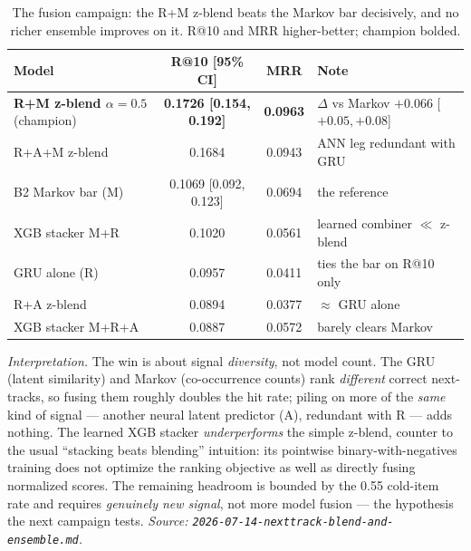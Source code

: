 \documentclass[11pt]{article}
\newcommand{\best}[1]{\textbf{#1}}
\begin{document}
\begin{table}[ht]
  \centering
  \caption{The fusion campaign: the R+M z-blend beats the Markov bar
  decisively, and no richer ensemble improves on it. R@10 and MRR
  higher-better; champion bolded.}
  \label{tab:blend}
  {\small\setlength{\tabcolsep}{5pt}\begin{tabular}{lccl}
    \toprule
    Model & R@10 [95\% CI] & MRR & Note \\
    \midrule
    \best{R+M z-blend $\alpha{=}0.5$} (champion) & \best{0.1726 [0.154, 0.192]} & \best{0.0963} & $\Delta$ vs Markov $+0.066$ [$+0.05,+0.08$] \\
    R+A+M z-blend                                & 0.1684 & 0.0943 & ANN leg redundant with GRU \\
    B2 Markov bar (M)                            & 0.1069 [0.092, 0.123] & 0.0694 & the reference \\
    XGB stacker M+R                              & 0.1020 & 0.0561 & learned combiner $\ll$ z-blend \\
    GRU alone (R)                                & 0.0957 & 0.0411 & ties the bar on R@10 only \\
    R+A z-blend                                  & 0.0894 & 0.0377 & $\approx$ GRU alone \\
    XGB stacker M+R+A                            & 0.0887 & 0.0572 & barely clears Markov \\
    \bottomrule
  \end{tabular}}
\end{table}

\emph{Interpretation.} The win is about signal \emph{diversity}, not model
count. The GRU (latent similarity) and Markov (co-occurrence counts) rank
\emph{different} correct next-tracks, so fusing them roughly doubles the hit
rate; piling on more of the \emph{same} kind of signal --- another neural latent
predictor (A), redundant with R --- adds nothing. The learned XGB stacker
\emph{underperforms} the simple z-blend, counter to the usual ``stacking beats
blending'' intuition: its pointwise binary-with-negatives training does not
optimize the ranking objective as well as directly fusing normalized scores. The
remaining headroom is bounded by the \num{0.55} cold-item rate and requires
\emph{genuinely new signal}, not more model fusion --- the hypothesis the next
campaign tests.
\emph{Source: \texttt{2026-07-14-nexttrack-blend-and-ensemble.md}.}
\end{document}
